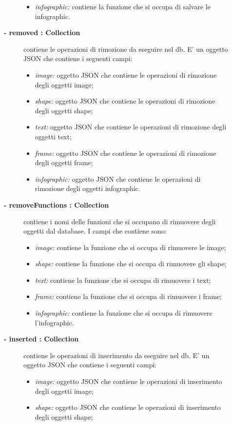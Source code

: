 \begin{description}
\begin{description}
\begin{itemize}
				\item \textit{infographic:} contiene la funzione che si occupa di salvare le infographic.
			\end{itemize}		
	\item[\textbf{- removed : Collection			}] \hfill
			contiene le operazioni di rimozione da eseguire nel db. E' un oggetto JSON che contiene i seguenti campi:
			\begin{itemize}
				\item \textit{image:} oggetto JSON che contiene le operazioni di rimozione degli oggetti image;
				\item \textit{shape:} oggetto JSON che contiene le operazioni di rimozione degli oggetti shape;
				\item \textit{text:} oggetto JSON che contiene le operazioni di rimozione degli oggetti text;
				\item \textit{frame:} oggetto JSON che contiene le operazioni di rimozione degli oggetti frame;
				\item \textit{infographic:} oggetto JSON che contiene le operazioni di rimozione degli oggetti infographic.
			\end{itemize}		
	\item[\textbf{- removeFunctions : Collection			}] \hfill
			contiene i nomi delle funzioni che si occupano di rimuovere degli oggetti dal database. I campi che contiene sono:
			\begin{itemize}
				\item \textit{image:} contiene la funzione che si occupa di rimuovere le image;
				\item \textit{shape:} contiene la funzione che si occupa di rimuovere gli shape;
				\item \textit{text:} contiene la funzione che si occupa di rimuovere i text;
				\item \textit{frame:} contiene la funzione che si occupa di rimuovere i frame;
				\item \textit{infographic:} contiene la funzione che si occupa di rimuovere l'infographic.
			\end{itemize}		
	\item[\textbf{- inserted : Collection			}] \hfill
			contiene le operazioni di inserimento da eseguire nel db. E' un oggetto JSON che contiene i seguenti campi:
			\begin{itemize}
				\item \textit{image:} oggetto JSON che contiene le operazioni di inserimento degli oggetti image;
				\item \textit{shape:} oggetto JSON che contiene le operazioni di inserimento degli oggetti shape;

\end{itemize}
\end{description}
\end{description}
